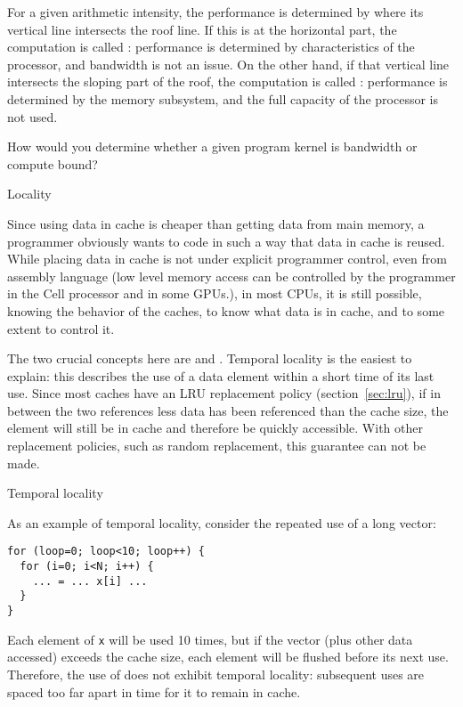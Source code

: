 For a given arithmetic intensity, the performance is determined by
where its vertical line intersects the roof line. If this is at the
horizontal part, the computation is called :
performance is determined by characteristics of the processor, and
bandwidth is not an issue. On the other hand, if that vertical line
intersects the sloping part of the roof, the computation is called
: performance is determined by the memory
subsystem, and the full capacity of the processor is not used.


\begin{exercise}
  How would you determine whether a given program kernel is bandwidth
  or compute bound?
\end{exercise}

 {Locality}
\label{sec:locality}

Since using data in cache is cheaper than getting data from main
memory, a programmer obviously wants to code in such a way that data
in cache is reused. While placing data in cache is not under explicit
programmer control, even from assembly language
(low level memory access can be controlled by the
    programmer in the Cell processor and in some GPUs.),
in most \acp{CPU}, it is still
possible, knowing the behavior of the caches, to know
what data is in cache, and to some extent to control it.

The two crucial concepts here are
 and
. Temporal locality is the easiest to explain: this
describes the use of a data element within a short time of its last
use.  Since most caches have an \ac{LRU} replacement policy
(section~\ref{sec:lru}), if in between the two references less data
has been referenced than the cache size, the element will still be in
cache and therefore be quickly accessible. With other replacement
policies, such as random replacement, this guarantee can not be made.

 {Temporal locality}

As an example of temporal locality, consider the repeated use of a
long vector:
\begin{verbatim}
for (loop=0; loop<10; loop++) {
  for (i=0; i<N; i++) {
    ... = ... x[i] ...
  }
}
\end{verbatim}
Each element of \texttt{x} will be used 10 times, but if the vector
(plus other data accessed) exceeds
the cache size, each element will be flushed before its
next use. Therefore, the use of  does not exhibit temporal
locality: subsequent uses are spaced too far apart in time for it to
remain in cache. 

